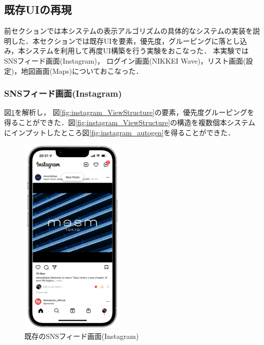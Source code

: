 \subsection{既存UIの再現}
前セクションでは本システムの表示アルゴリズムの具体的なシステムの実装を説明した．本セクションでは既存UIを要素，優先度，グルーピングに落とし込み，本システムを利用して再度UI構築を行う実験をおこなった．
本実験ではSNSフィード画面(Instagram)， ログイン画面(NIKKEI Wave)，リスト画面(設定)，地図画面(Maps)についておこなった．
\subsubsection{SNSフィード画面(Instagram)}
図\ref{fig:instagram_screenshot}を解析し， 図\ref{fig:instagram_ViewStructure}の要素，優先度グルーピングを得ることができた．図\ref{fig:instagram_ViewStructure}の構造を複数個本システムにインプットしたところ図\ref{fig:instagram_autogen}を得ることができた．


\begin{figure}[htbp]
  \begin{minipage}{\hsize}
    \begin{center}
       \includegraphics[width=50mm]{img/instagram_screenshot.png}
    \end{center}
    \caption{既存のSNSフィード画面(Instagram)}
    \label{fig:instagram_screenshot}
  \end{minipage}
\end{figure}

